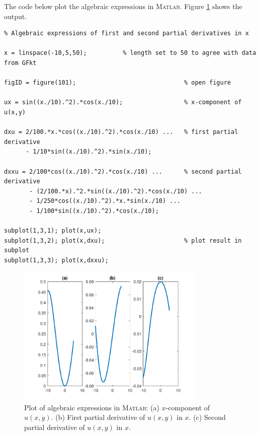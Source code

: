 \documentclass[paper=a4, fontsize=12pt]{article} %
\begin{document}
\newpage

The code below plot the algebraic expressions in \textsc{Matlab}. Figure \ref{fig:algebraic} shows the output.

\begin{lstlisting}
% Algebraic expressions of first and second partial derivatives in x

x = linspace(-10,5,50);		     % length set to 50 to agree with data from GFkt

figID = figure(101);                              % open figure

ux = sin((x./10).^2).*cos(x./10);                 % x-component of u(x,y)

dxu = 2/100.*x.*cos((x./10).^2).*cos(x./10) ...   % first partial derivative
      - 1/10*sin((x./10).^2).*sin(x./10);

dxxu = 2/100*cos((x./10).^2).*cos(x./10) ...      % second partial derivative
       - (2/100.*x).^2.*sin((x./10).^2).*cos(x./10) ...
       - 1/250*cos((x./10).^2).*x.*sin(x./10) ...
       - 1/100*sin((x./10).^2).*cos(x./10);

subplot(1,3,1); plot(x,ux);
subplot(1,3,2); plot(x,dxu);                      % plot result in subplot
subplot(1,3,3); plot(x,dxxu);

\end{lstlisting}


\begin{figure}[H]
  \centering
  \includegraphics[width=0.8\textwidth]{algebraicDeriv.pdf}
  \caption{\small Plot of algebraic expressions in \textsc{Matlab}: (a) $x$-component of $u(x,y)$. (b) First partial derivative of $u(x,y)$ in $x$. (c) Second partial derivative of $u(x,y)$ in $x$.\label{fig:algebraic}}
\end{figure}
\end{document}
